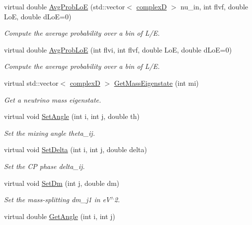 \begin{DoxyCompactItemize}
virtual double \hyperlink{classOscProb_1_1PMNS__Base_a19f160c045a01e5083506e925fb37d44}{Avg\+Prob\+LoE} (std\+::vector$<$ \hyperlink{EigenPoint_8h_a67ca8e107e20610c3fff78d5e726ece0}{complexD} $>$ nu\+\_\+in, int flvf, double LoE, double d\+LoE=0)
\begin{DoxyCompactList}\small\item\em Compute the average probability over a bin of L/E. \end{DoxyCompactList}\item 
virtual double \hyperlink{classOscProb_1_1PMNS__Base_ac19a92f4ef428a7333ca8eed76fca637}{Avg\+Prob\+LoE} (int flvi, int flvf, double LoE, double d\+LoE=0)
\begin{DoxyCompactList}\small\item\em Compute the average probability over a bin of L/E. \end{DoxyCompactList}\item 
virtual std\+::vector$<$ \hyperlink{EigenPoint_8h_a67ca8e107e20610c3fff78d5e726ece0}{complexD} $>$ \hyperlink{classOscProb_1_1PMNS__Base_a5092561dd8579d390c649eb60803ea98}{Get\+Mass\+Eigenstate} (int mi)
\begin{DoxyCompactList}\small\item\em Get a neutrino mass eigenstate. \end{DoxyCompactList}\item 
virtual void \hyperlink{classOscProb_1_1PMNS__Base_ace7875cf6d3bec161a2b7ed2690aec34}{Set\+Angle} (int i, int j, double th)
\begin{DoxyCompactList}\small\item\em Set the mixing angle theta\+\_\+ij. \end{DoxyCompactList}\item 
virtual void \hyperlink{classOscProb_1_1PMNS__Base_a4bef78cfcfc4e70b4ce79cdb8862c0a3}{Set\+Delta} (int i, int j, double delta)
\begin{DoxyCompactList}\small\item\em Set the CP phase delta\+\_\+ij. \end{DoxyCompactList}\item 
virtual void \hyperlink{classOscProb_1_1PMNS__Base_a492243b22fb1b783cd2943f507cff970}{Set\+Dm} (int j, double dm)
\begin{DoxyCompactList}\small\item\em Set the mass-\/splitting dm\+\_\+j1 in e\+V$^\wedge$2. \end{DoxyCompactList}\item 
virtual double \hyperlink{classOscProb_1_1PMNS__Base_acee137091304c919642293ddf015bbc8}{Get\+Angle} (int i, int j)

\end{DoxyCompactItemize}
